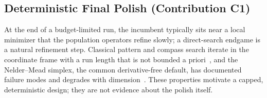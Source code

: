 \subsection{Deterministic Final Polish (Contribution C1)}\label{sec:alg:polish}

At the end of a budget-limited run, the incumbent typically sits near
a local minimizer that the population operators refine slowly; a
direct-search endgame is a natural refinement step.
Classical pattern and compass search iterate in the coordinate frame
with a run length that is not bounded a
priori~\cite{kolda2003directsearch}, and the Nelder--Mead simplex, the
common derivative-free default, has documented failure modes and
degrades with
dimension~\cite{nelder1965simplex,kolda2003directsearch,gao2012implementing}.
These properties motivate a capped, deterministic design; they are not
evidence about the polish itself.

